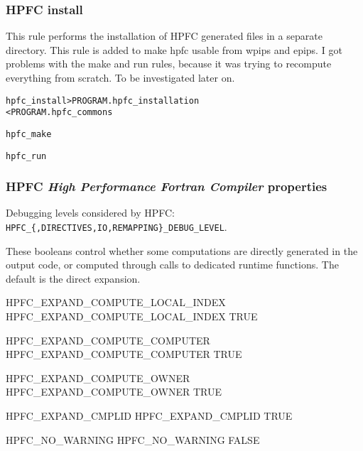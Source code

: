\documentclass[a4paper]{report}
\newenvironment{PipsMake}{\begin{alltt}}{\end{alltt}}
\begin{document}
\subsubsection{HPFC install}

This rule performs the installation of HPFC generated files in a separate
directory. This rule is added to make hpfc usable from wpips and epips. I
got problems with the make and run rules, because it was trying to
recompute everything from scratch. To be investigated later on.

\begin{PipsMake}
hpfc_install            > PROGRAM.hpfc_installation
    < PROGRAM.hpfc_commons

hpfc_make

hpfc_run

\end{PipsMake}

\subsubsection{HPFC {\em High Performance Fortran Compiler} properties}

Debugging levels considered by HPFC:
\verb+HPFC_{,DIRECTIVES,IO,REMAPPING}_DEBUG_LEVEL+.

  These booleans control whether some computations are directly
generated in the output code, or computed through calls to dedicated
runtime functions. The default is the direct expansion.

\begin{PipsProp}{HPFC_EXPAND_COMPUTE_LOCAL_INDEX}
HPFC_EXPAND_COMPUTE_LOCAL_INDEX TRUE
\end{PipsProp}
\begin{PipsProp}{HPFC_EXPAND_COMPUTE_COMPUTER}
HPFC_EXPAND_COMPUTE_COMPUTER TRUE
\end{PipsProp}
\begin{PipsProp}{HPFC_EXPAND_COMPUTE_OWNER}
HPFC_EXPAND_COMPUTE_OWNER TRUE
\end{PipsProp}
\begin{PipsProp}{HPFC_EXPAND_CMPLID}
HPFC_EXPAND_CMPLID TRUE
\end{PipsProp}
\begin{PipsProp}{HPFC_NO_WARNING}
HPFC_NO_WARNING FALSE
\end{PipsProp}
\end{document}
